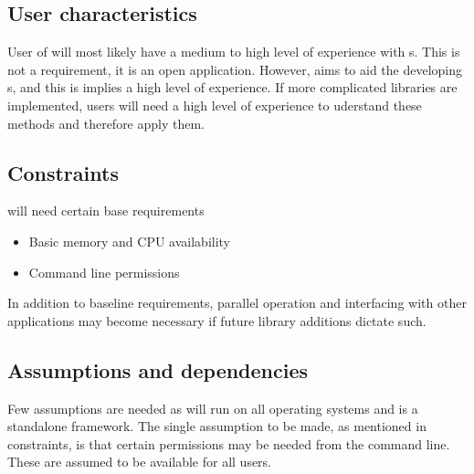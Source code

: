 
\subsection{User characteristics}

User of \cry{} will most likely have a medium to high level of experience with \cs s. This is not a requirement,
it is an open application. However, \cry{} aims to aid the developing \cs s, and this is implies a high level of experience.
If more complicated libraries are implemented, users will need a high level of experience to uderstand these methods and therefore apply
them.


\subsection{Constraints}

\cry{} will need certain base requirements
\begin{itemize}
  \item Basic memory and CPU availability
  \item Command line permissions
\end{itemize}

In addition to baseline requirements, parallel operation and interfacing with other applications may become necessary if
future library additions dictate such.


\subsection{Assumptions and dependencies}

Few assumptions are needed as \cry{} will run on all operating systems and is a standalone framework. The single assumption to be
made, as mentioned in constraints, is that certain permissions may be needed from the command line. These are assumed to be available for all users.

